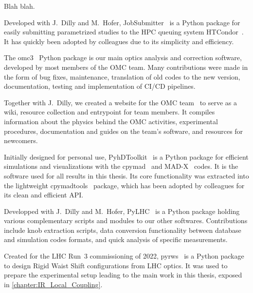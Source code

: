 Blah blah.

Developed with J.~Dilly and M.~Hofer, JobSubmitter~\cite{CODE:OMC:pylhc_submitter} is a Python package for easily submitting parametrized studies to the HPC queuing system HTCondor~\cite{CODE:Douglas:condor-practice}.
It has quickly been adopted by colleagues due to its simplicity and efficiency.

The omc3~\cite{CODE:OMC:omc3} Python package is our main optics analysis and correction software, developed by most members of the OMC team.
Many contributions were made in the form of bug fixes, maintenance, translation of old codes to the new version, documentation, testing and implementation of CI/CD pipelines.

Together with J.~Dilly, we created a website for the OMC team~\cite{Website:OMC_Documentation} to serve as a wiki, resource collection and entrypoint for team members.
It compiles information about the physics behind the OMC activities, experimental procedures, documentation and guides on the team's software, and resources for newcomers.

Initially designed for personal use, PyhDToolkit~\cite{CODE:Soubelet:pyhdtoolkit} is a Python package for efficient simulations and visualizations with the cpymad~\cite{CODE:HIBTC:cpymad} and MAD-X~\cite{CODE:MADX_guide} codes.
It is the software used for all results in this thesis.
Its core functionality was extracted into the lightweight cpymadtools~\cite{CODE:Soubelet:cpymadtools} package, which has been adopted by colleagues for its clean and efficient API.

Developped with J.~Dilly and M.~Hofer, PyLHC~\cite{CODE:OMC:pylhc} is a Python package holding various complementary scripts and modules to our other softwares.
Contributions include knob extraction scripts, data conversion functionality between database and simulation codes formats, and quick analysis of specific measurements.

Created for the LHC Run~\num{3} commissioning of \num{2022}, pyrws~\cite{CODE:Soubelet:pyrws} is a Python package to design Rigid Waist Shift configurations from LHC optics.
It was used to prepare the experimental setup leading to the main work in this thesis, exposed in \cref{chapter:IR_Local_Coupling}.

